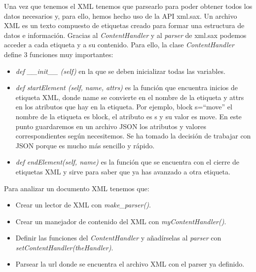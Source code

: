 \documentclass[a4paper, 12pt]{book}
\begin{document}
  Una vez que tenemos el XML tenemos que parsearlo para poder obtener todos los datos necesarios y, para ello, hemos hecho uso de la API xml.sax. Un archivo XML es un texto compuesto de etiquetas creado para formar una estructura de datos e información. Gracias al \textit{ContentHandler} y al \textit{parser} de xml.sax podemos acceder a cada etiqueta y a su contenido. Para ello, la clase \textit{ContentHandler} define 3 funciones muy importantes:
 \begin{itemize}
     \item  \textit{def \_\_init\_\_ (self)} en la que se deben inicializar todas las variables.
     \item \textit{def startElement (self, name, attrs)} es la función que encuentra inicios de etiqueta XML, donde name se convierte en el nombre de la etiqueta y attrs en los atributos que hay en la etiqueta. Por ejemplo, block s=``move'' el nombre de la etiqueta es block, el atributo es s y su valor es move. En este punto guardaremos en un archivo JSON los atributos y valores correspondientes  según necesitemos. Se ha tomado la decisión de trabajar con JSON porque es mucho más sencillo y rápido.
     \item \textit{def endElement(self, name)} es la función que se encuentra con el cierre de etiquetas XML y sirve para saber que ya  has avanzado a otra etiqueta.

 \end{itemize}
 Para analizar un documento XML tenemos que:
 \begin{itemize}
     \item Crear un lector de XML con \textit{make\_parser()}.
     \item  Crear un manejador de contenido del XML con \textit{myContentHandler()}.
     \item Definir las funciones del \textit{ContentHandler} y añadírselas al \textit{parser} con \textit{setContentHandler(theHandler)}.
     \item Parsear la url donde se encuentra el archivo XML con el parser ya definido.
 \end{itemize}
 
\end{document}
